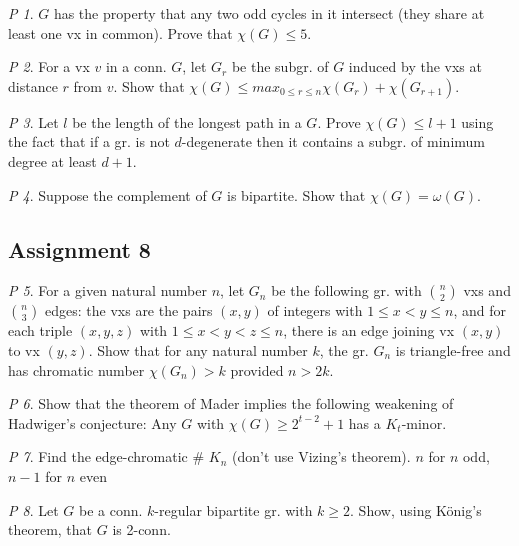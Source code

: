 \documentclass[11pt, fleqn, a4paper, landscape]{article}
\theoremstyle{plain} %
\theoremstyle{remark} %
\newtheorem{problem}{P}
\theoremstyle{definition} %
\begin{document}
\begin{multicols}{5}
\begin{problem}
$G$ has the property that any two odd cycles in it intersect (they share at least one vx in common). Prove that $\chi(G) \le 5.$
\end{problem}

\begin{problem}
For a vx $v$ in a conn. $G$, let $G_r$ be the subgr. of $G$ induced by the vxs at distance $r$ from $v$. Show that $\chi(G) \le max_{0\le r\le n}\chi(G_r) + \chi(G_{r+1})$.
\end{problem}

\begin{problem}
Let $l$ be the length of the longest path in a $G$. Prove $\chi(G)\le l + 1$ using the fact that if a gr. is not $d$-degenerate then it contains a subgr. of minimum degree at least $d + 1$.
\end{problem}

\begin{problem}
Suppose the complement of $G$ is bipartite. Show that $\chi(G) = \omega(G).$
\end{problem}

\subsection{Assignment 8}

\begin{problem}
For a given natural number $n$, let $G_n$ be the following gr. with $\binom{n}{2}$ vxs and $\binom{n}{3}$ edges: the vxs are the pairs $(x, y)$ of integers with $1\le x < y \le n$, and for each triple $(x, y, z)$ with $1\le x < y < z\le n$, there is an edge joining vx $(x, y)$ to vx $(y, z)$. Show that for any natural number $k$, the gr. $G_n$ is triangle-free and has chromatic number $\chi(G_n) > k$ provided $n > 2k$.
\end{problem}

\begin{problem}
Show that the theorem of Mader implies the following weakening of Hadwiger's
conjecture: Any $G$ with $\chi(G) \ge 2^{t-2} + 1$ has a $K_t$-minor.
\end{problem}

\begin{problem}
Find the edge-chromatic \# $K_n$ (don't use Vizing's theorem). $n$ for $n$ odd, $n-1$ for $n$ even
\end{problem}

\begin{problem}
Let $G$ be a conn. $k$-regular bipartite gr. with $k\ge 2$. Show, using König's theorem, that $G$ is 2-conn.
\end{problem}


\end{multicols}
\end{document}
